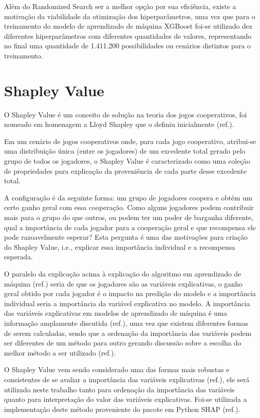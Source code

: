 Além do Randomized Search ser a melhor opção por sua eficiência, existe a motivação da viabilidade da otimização dos hiperparâmetros, uma vez que para o treinamento do modelo de aprendizado de máquina XGBoost foi-se utilizado dez diferentes hiperparâmetros com diferentes quantidades de valores, representando no final uma quantidade de 1.411.200 possibilidades ou cenários distintos para o treinamento.

\section{Shapley Value}
\label{sec:shapley_value}

O Shapley Value é um conceito de solução na teoria dos jogos cooperativos, foi nomeado em homenagem a Lloyd Shapley que o definiu inicialmente (ref.). 

Em um cenário de jogos cooperativos onde, para cada jogo cooperativo, atribui-se uma distribuição única (entre os jogadores) de um excedente total gerado pelo grupo de todos os jogadores, o Shapley Value é caracterizado como uma coleção de propriedades para explicação da proveniência de cada parte desse excedente total.

A configuração é da seguinte forma: um grupo de jogadores coopera e obtém um certo ganho geral com essa cooperação. Como alguns jogadores podem contribuir mais para o grupo do que outros, ou podem ter um poder de barganha diferente, qual a importância de cada jogador para a cooperação geral e que recompensa ele pode razoavelmente esperar? Esta pergunta é uma das motivações para criação do Shapley Value, i.e., explicar essa importância individual e a recompensa esperada.

O paralelo da explicação acima à explicação do algoritmo em aprendizado de máquina (ref.) seria de que os jogadores são as variáveis explicativas, o ganho geral obtido por cada jogador é o impacto na predição do modelo e a importância individual seria a importância da variável explicativa no modelo. A importância das variáveis explicativas em modelos de aprendizado de máquina é uma informação amplamente discutida (ref.), uma vez que existem diferentes formas de serem calculadas, sendo que a ordenação da importância das variáveis podem ser diferentes de um método para outro gerando discussão sobre a escolha do melhor método a ser utilizado (ref.).

O Shapley Value vem sendo considerado uma das formas mais robustas e consistentes de se avaliar a importância das variáveis explicativas (ref.), ele será utilizado neste trabalho tanto para ordenação da importância das variáveis quanto para interpretação do valor das variáveis explicativas. Foi-se utilizada a implementação deste método proveniente do pacote em Python SHAP (ref.).

